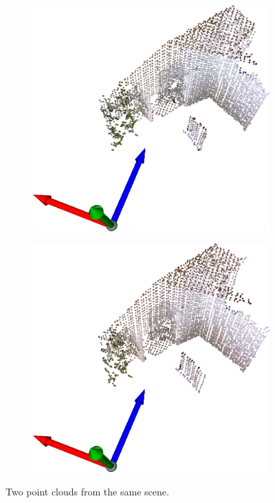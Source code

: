 \documentclass[journal]{IEEEtran}
\begin{document}
\begin{figure}[htp]
  \centering
  \begin{subfigure}[b]{2.5in}
    \centering
    \includegraphics[width=\textwidth]{imgs/7.4_pcd_1.png}
    \caption{}
  \end{subfigure}

  \begin{subfigure}[b]{2.5in}
    \centering
    \includegraphics[width=\textwidth]{imgs/7.4_pcd_2.png}
    \caption{}
  \end{subfigure}
  \caption{Two point clouds from the same scene.}
  \label{fig:7.4_pcd_office}
\end{figure}
\FloatBarrier
\end{document}
